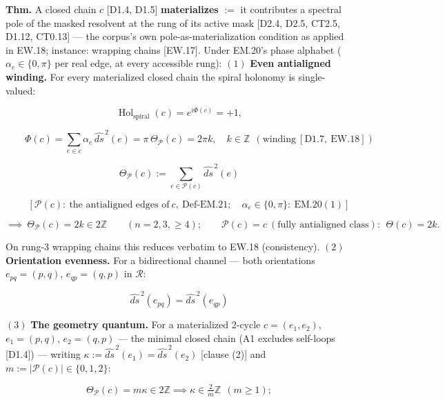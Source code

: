 \begin{theorem}\label{tag:CT1-19b}
\textbf{Thm.} A closed chain $c$ [D1.4, D1.5] \textbf{materializes} $:=$ it contributes a spectral pole of the masked resolvent at the rung of its active mask [D2.4, D2.5, CT2.5, D1.12, CT0.13] — the corpus's own pole-as-materialization condition as applied in EW.18; instance: wrapping chains [EW.17]. Under EM.20's phase alphabet ($\alpha_e\in\{0,\pi\}$ per real edge, at every accessible rung): $(1)$ \textbf{Even antialigned winding.} For every materialized closed chain the spiral holonomy is single-valued:

\[
\operatorname{Hol}_{\mathrm{spiral}}(c)=e^{i\Phi(c)}=+1,
\]

\[
\qquad \Phi(c)=\sum_{e\in c}\alpha_e\,\widehat{ds}^{\,2}(e)=\pi\,\Theta_{\mathcal P}(c)=2\pi k,\quad k\in\mathbb Z\ \ (\text{winding}\ [\mathrm{D1.7},\ \mathrm{EW.18}])
\]

\[
\Theta_{\mathcal P}(c):=\!\!\sum_{e\in\mathcal P(c)}\!\!\widehat{ds}^{\,2}(e)
\]

\[
\qquad [\mathcal P(c):\ \text{the antialigned edges of}\ c,\ \mathrm{Def\text{-}EM.21};\quad \alpha_e\in\{0,\pi\}:\ \mathrm{EM.20}(1)]
\]

\[
\implies\ \Theta_{\mathcal P}(c)=2k\in2\mathbb Z\qquad(n=2,3,\ge4);\qquad \mathcal P(c)=c\ (\text{fully antialigned class}):\ \ \Theta(c)=2k .
\]

On rung-3 wrapping chains this reduces verbatim to EW.18 (consistency). $(2)$ \textbf{Orientation evenness.} For a bidirectional channel — both orientations $e_{pq}=(p,q)$, $e_{qp}=(q,p)$ in $\mathcal R$:

\[
\widehat{ds}^{\,2}(e_{pq})=\widehat{ds}^{\,2}(e_{qp})
\]

$(3)$ \textbf{The geometry quantum.} For a materialized 2-cycle $c=(e_1,e_2)$, $e_1=(p,q)$, $e_2=(q,p)$ — the minimal closed chain (A1 excludes self-loops [D1.4]) — writing $\kappa:=\widehat{ds}^{\,2}(e_1)=\widehat{ds}^{\,2}(e_2)$ [clause (2)] and $m:=|\mathcal P(c)|\in\{0,1,2\}$:

\[
\Theta_{\mathcal P}(c)=m\kappa\in2\mathbb Z\implies\kappa\in\tfrac2m\mathbb Z\ \ (m\ge1);
\]


\end{theorem}

